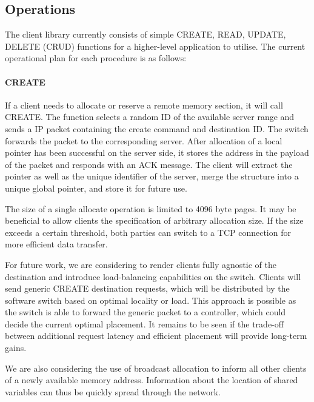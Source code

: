 \subsection{Operations}

The client library currently consists of simple CREATE, READ, UPDATE, DELETE (CRUD) functions for a higher-level application to utilise. The current operational plan for each procedure is as follows:

\paragraph{\textbf{CREATE}}
If a client needs to allocate or reserve a remote memory section, it will call CREATE. The function selects a random ID of the available server range and sends a IP packet containing the create command and destination ID. The switch forwards the packet to the corresponding server. After allocation of a local pointer has been successful on the server side, it stores the address in the payload of the packet and responds with an ACK message. The client will extract the pointer as well as the unique identifier of the server, merge the structure into a unique global pointer, and store it for future use.

The size of a single allocate operation is limited to 4096 byte pages. It may be beneficial to allow clients the specification of arbitrary allocation size. If the size exceeds a certain threshold, both parties can switch to a TCP connection for more efficient data transfer.

For future work, we are considering to render clients fully agnostic of the destination and introduce load-balancing capabilities on the switch. Clients will send generic CREATE destination requests, which will be distributed by the software switch based on optimal locality or load. This approach is possible as the switch is able to forward the generic packet to a controller, which could decide the current optimal placement. It remains to be seen if the trade-off between additional request latency and efficient placement will provide long-term gains.

We are also considering the use of broadcast allocation to inform all other clients of a newly available memory address. Information about the location of shared variables can thus be quickly spread through the network.

